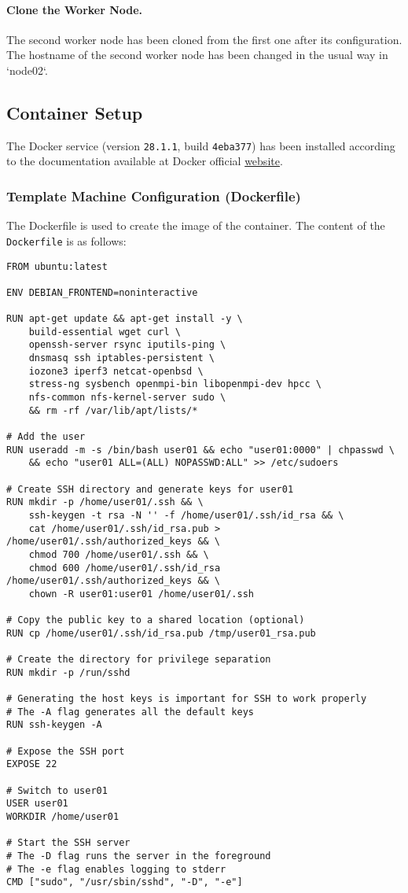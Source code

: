 \paragraph{Clone the Worker Node.}
The second worker node has been cloned from the first one after its configuration. The hostname of the second worker node has been changed in the usual way in `node02`. 

\subsection{Container Setup}

The Docker service (version \texttt{28.1.1}, build \texttt{4eba377}) has been installed according to the documentation available at Docker official \href{https://docs.docker.com/engine/install/ubuntu/#install-using-the-repository}{website}.

\subsubsection{Template Machine Configuration (Dockerfile)}

The Dockerfile is used to create the image of the container. The content of the \texttt{Dockerfile} is as follows:


\begin{verbatim}
FROM ubuntu:latest

ENV DEBIAN_FRONTEND=noninteractive

RUN apt-get update && apt-get install -y \
    build-essential wget curl \
    openssh-server rsync iputils-ping \
    dnsmasq ssh iptables-persistent \
    iozone3 iperf3 netcat-openbsd \
    stress-ng sysbench openmpi-bin libopenmpi-dev hpcc \
    nfs-common nfs-kernel-server sudo \
    && rm -rf /var/lib/apt/lists/*

# Add the user
RUN useradd -m -s /bin/bash user01 && echo "user01:0000" | chpasswd \
    && echo "user01 ALL=(ALL) NOPASSWD:ALL" >> /etc/sudoers

# Create SSH directory and generate keys for user01
RUN mkdir -p /home/user01/.ssh && \
    ssh-keygen -t rsa -N '' -f /home/user01/.ssh/id_rsa && \
    cat /home/user01/.ssh/id_rsa.pub > /home/user01/.ssh/authorized_keys && \
    chmod 700 /home/user01/.ssh && \
    chmod 600 /home/user01/.ssh/id_rsa /home/user01/.ssh/authorized_keys && \
    chown -R user01:user01 /home/user01/.ssh

# Copy the public key to a shared location (optional)
RUN cp /home/user01/.ssh/id_rsa.pub /tmp/user01_rsa.pub

# Create the directory for privilege separation
RUN mkdir -p /run/sshd

# Generating the host keys is important for SSH to work properly
# The -A flag generates all the default keys
RUN ssh-keygen -A

# Expose the SSH port
EXPOSE 22

# Switch to user01
USER user01
WORKDIR /home/user01

# Start the SSH server
# The -D flag runs the server in the foreground
# The -e flag enables logging to stderr
CMD ["sudo", "/usr/sbin/sshd", "-D", "-e"]
\end{verbatim}


